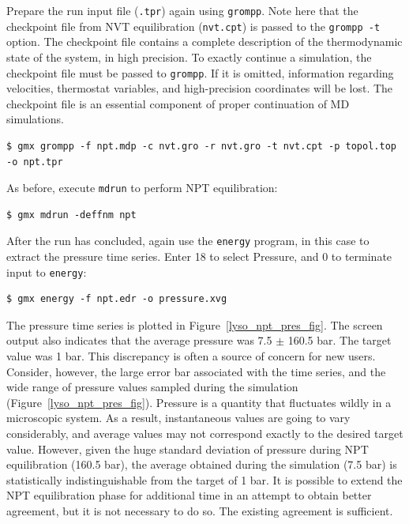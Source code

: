 \documentclass[9pt,tutorial,pubversion]{livecoms}
\begin{document}
Prepare the run input file (\texttt{.tpr}) again using \texttt{grompp}. Note here that the checkpoint file from NVT equilibration (\texttt{nvt.cpt}) is passed to the \texttt{grompp -t} option. The checkpoint file contains a complete description of the thermodynamic state of the system, in high precision. To exactly continue a simulation, the checkpoint file must be passed to \texttt{grompp}. If it is omitted, information regarding velocities, thermostat variables, and high-precision coordinates will be lost. The checkpoint file is an essential component of proper continuation of MD simulations.

\begin{lstlisting}
$ gmx grompp -f npt.mdp -c nvt.gro -r nvt.gro -t nvt.cpt -p topol.top -o npt.tpr
\end{lstlisting}

As before, execute \texttt{mdrun} to perform NPT equilibration:

\begin{lstlisting}
$ gmx mdrun -deffnm npt
\end{lstlisting}

After the run has concluded, again use the \texttt{energy} program, in this case to extract the pressure time series. Enter 18 to select Pressure, and 0 to terminate input to \texttt{energy}:

\begin{lstlisting}
$ gmx energy -f npt.edr -o pressure.xvg
\end{lstlisting}

The pressure time series is plotted in Figure~\ref{lyso_npt_pres_fig}. The screen output also indicates that the average pressure was 7.5 $\pm$ 160.5 bar. The target value was 1 bar. This discrepancy is often a source of concern for new users. Consider, however, the large error bar associated with the time series, and the wide range of pressure values sampled during the simulation (Figure~\ref{lyso_npt_pres_fig}). Pressure is a quantity that fluctuates wildly in a microscopic system. As a result, instantaneous values are going to vary considerably, and average values may not correspond exactly to the desired target value. However, given the huge standard deviation of pressure during NPT equilibration (160.5 bar), the average obtained during the simulation (7.5 bar) is statistically indistinguishable from the target of 1 bar. It is possible to extend the NPT equilibration phase for additional time in an attempt to obtain better agreement, but it is not necessary to do so. The existing agreement is sufficient.
\end{document}
